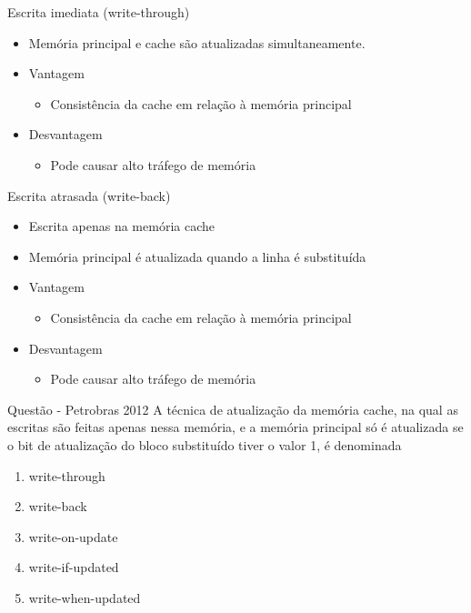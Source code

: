 \documentclass[aspectratio=169,
				xcolor=table]{beamer}
\begin{document}
	\begin{frame}{Escrita imediata (write-through)}
		\begin{itemize}
			\item Memória principal e cache são atualizadas simultaneamente.
			\vspace{1em}		 
			\item Vantagem
			\begin{itemize}
				\item Consistência da cache em relação à memória principal
			\end{itemize}
			\vspace{1em}
			\item Desvantagem
			\begin{itemize}
				\item Pode causar alto tráfego de memória				
			\end{itemize}		
		
		\end{itemize}
		
	\end{frame}
	
	\begin{frame}{Escrita atrasada (write-back)}
		\begin{itemize}
			\item Escrita apenas na memória cache
			\vspace{1em}
			\item Memória principal é atualizada quando a linha é substituída
			\vspace{1em}
			\item Vantagem
			\begin{itemize}
				\item Consistência da cache em relação à memória principal
			\end{itemize}
			\vspace{1em}
			\item Desvantagem
			\begin{itemize}
				\item Pode causar alto tráfego de memória				
			\end{itemize}			
		\end{itemize}
	\end{frame}

	\begin{frame}{Questão - Petrobras 2012}
		A técnica de atualização da memória cache, na qual as escritas são feitas apenas nessa memória, e a memória principal só é atualizada se o bit de atualização do bloco substituído tiver o valor 1, é denominada
		
		\begin{enumerate}[a]
			\item write-through
			\item write-back
			\item write-on-update
			\item write-if-updated
			\item write-when-updated		
		\end{enumerate}



	\end{frame}
	
\end{document}

